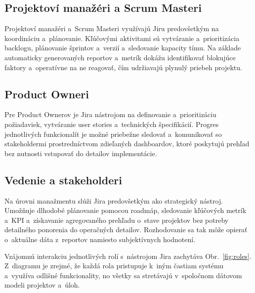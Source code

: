 \subsection{Projektoví manažéri a Scrum Masteri}

Projektoví manažéri a~Scrum Masteri využívajú Jiru predovšetkým na koordináciu a~plánovanie. Kľúčovými aktivitami sú vytváranie a~prioritizácia backlogu, plánovanie šprintov a~verzií a~sledovanie kapacity tímu. Na základe automaticky generovaných reportov a~metrík dokážu identifikovať blokujúce faktory a~operatívne na ne reagovať, čím udržiavajú plynulý priebeh projektu.

\subsection{Product Owneri}

Pre Product Ownerov je Jira nástrojom na definovanie a~prioritizáciu požiadaviek, vytváranie user stories a~technických špecifikácií. Progres jednotlivých funkcionalít je možné priebežne sledovať a~komunikovať so stakeholdermi prostredníctvom zdieľaných dashboardov, ktoré poskytujú prehľad bez nutnosti vstupovať do detailov implementácie.

\subsection{Vedenie a stakeholderi}

Na úrovni manažmentu slúži Jira predovšetkým ako strategický nástroj. Umožňuje dlhodobé plánovanie pomocou roadmáp, sledovanie kľúčových metrík a~KPI a~získavanie agregovaného prehľadu o~stave projektov bez potreby detailného ponorenia do operačných detailov. Rozhodovanie sa tak môže opierať o~aktuálne dáta z~reportov namiesto subjektívnych hodnotení.

Vzájomnú interakciu jednotlivých rolí s~nástrojom Jira zachytáva Obr.~\ref{fig:roles}. Z~diagramu je zrejmé, že každá rola pristupuje k~iným častiam systému a~využíva odlišné funkcionality, no všetky sa stretávajú v~spoločnom dátovom modeli projektov a~úloh.

